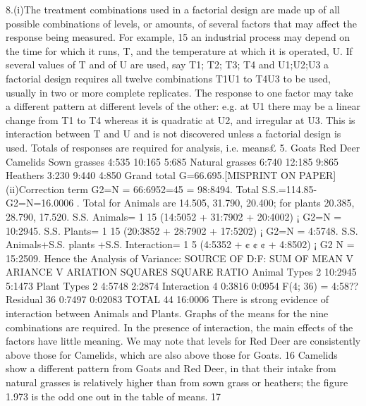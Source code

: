 \documentclass[a4paper,12pt]{article}
\begin{document}
8.(i)The treatment combinations used in a factorial design are made up of all possible combinations
of levels, or amounts, of several factors that may affect the response being measured. For example,
15
an industrial process may depend on the time for which it runs, T, and the temperature at which it
is operated, U. If several values of T and of U are used, say T1; T2; T3; T4 and U1;U2;U3 a factorial
design requires all twelve combinations T1U1 to T4U3 to be used, usually in two or more complete
replicates.
The response to one factor may take a different pattern at different levels of the other: e.g. at
U1 there may be a linear change from T1 to T4 whereas it is quadratic at U2, and irregular at U3.
This is interaction between T and U and is not discovered unless a factorial design is used.
Totals of responses are required for analysis, i.e. means£ 5.
Goats Red Deer Camelids
Sown grasses 4:535 10:165 5:685
Natural grasses 6:740 12:185 9:865
Heathers 3:230 9:440 4:850
Grand total G=66.695.[MISPRINT ON PAPER]
(ii)Correction term G2=N = 66:6952=45 = 98:8494.
Total S.S.=114.85-G2=N=16.0006 .
Total for Animals are 14.505, 31.790, 20.400; for plants 20.385, 28.790, 17.520.
S.S. Animals= 1
15 (14:5052 + 31:7902 + 20:4002) ¡ G2=N = 10:2945.
S.S. Plants= 1
15 (20:3852 + 28:7902 + 17:5202) ¡ G2=N = 4:5748.
S.S. Animals+S.S. plants +S.S. Interaction= 1
5 (4:5352 + ¢ ¢ ¢ + 4:8502) ¡ G2
N = 15:2509.
Hence the Analysis of Variance:
SOURCE OF D:F: SUM OF MEAN V ARIANCE
V ARIATION SQUARES SQUARE RATIO
Animal Types 2 10:2945 5:1473
Plant Types 2 4:5748 2:2874
Interaction 4 0:3816 0:0954 F(4; 36) = 4:58??
Residual 36 0:7497 0:02083
TOTAL 44 16:0006
There is strong evidence of interaction between Animals and Plants. Graphs of the means for
the nine combinations are required.
In the presence of interaction, the main effects of the factors have little meaning. We may
note that levels for Red Deer are consistently above those for Camelids, which are also above those
for Goats.
16
Camelids show a different pattern from Goats and Red Deer, in that their intake from natural
grasses is relatively higher than from sown grass or heathers; the figure 1.973 is the odd one out
in the table of means.
17
\end{document}
